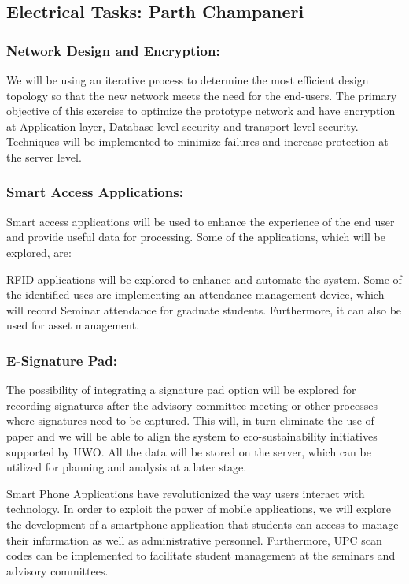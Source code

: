 \documentclass{journal}
\begin{document}
\subsection{ Electrical Tasks: Parth Champaneri }

\subsubsection{Network Design and Encryption:}

We will be using an iterative process to determine the most efficient design topology so that the new network meets the need for the end-users. The primary objective of this exercise to optimize the prototype network and have encryption at Application layer, Database level security and transport level security. Techniques will be implemented to minimize failures and increase protection at the server level. 

\subsubsection{Smart Access Applications:} Smart access applications will be used to enhance the experience of the end user and provide useful data for processing. Some of the applications, which will be explored, are:

RFID applications will be explored to enhance and automate the system. Some of the identified uses are implementing an attendance management device, which will record Seminar attendance for graduate students. Furthermore, it can also be used for asset management.

\subsubsection{E-Signature Pad:} The possibility of integrating a signature pad option will be explored for recording signatures after the advisory committee meeting or other processes where signatures need to be captured. This will, in turn eliminate the use of paper and we will be able to align the system to eco-sustainability initiatives supported by UWO. All the data will be stored on the server, which can be utilized for planning and analysis at a later stage.

Smart Phone Applications have revolutionized the way users interact with technology. In order to exploit the power of mobile applications, we will explore the development of a smartphone application that students can access to manage their information as well as administrative personnel. Furthermore, UPC scan codes can be implemented to facilitate student management at the seminars and advisory committees.
\end{document}

